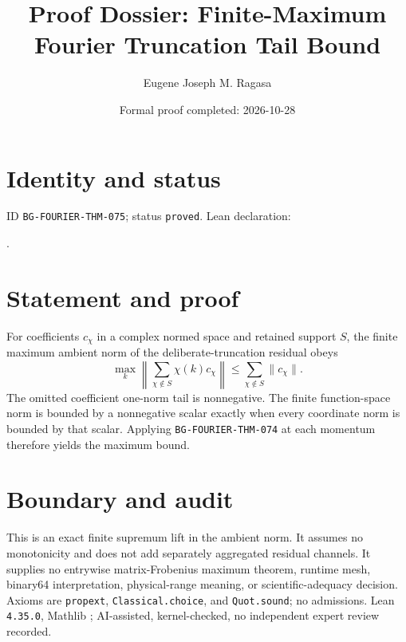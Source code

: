 \documentclass[11pt]{article}
\title{Proof Dossier: Finite-Maximum Fourier Truncation Tail Bound}\author{Eugene Joseph M. Ragasa}\date{Formal proof completed: 2026-10-28}
\begin{document}
\raggedright\maketitle
\section{Identity and status}
ID \texttt{BG-FOURIER-THM-075}; status \texttt{proved}. Lean declaration:
\par{}.
\section{Statement and proof}
For coefficients $c_\chi$ in a complex normed space and retained support $S$, the finite maximum ambient norm of the deliberate-truncation residual obeys
\[
 \max_k\left\|\sum_{\chi\notin S}\chi(k)c_\chi\right\|
 \leq \sum_{\chi\notin S}\|c_\chi\|.
\]
The omitted coefficient one-norm tail is nonnegative. The finite function-space norm is bounded by a nonnegative scalar exactly when every coordinate norm is bounded by that scalar. Applying \texttt{BG-FOURIER-THM-074} at each momentum therefore yields the maximum bound.
\section{Boundary and audit}
This is an exact finite supremum lift in the ambient norm. It assumes no monotonicity and does not add separately aggregated residual channels. It supplies no entrywise matrix-Frobenius maximum theorem, runtime mesh, binary64 interpretation, physical-range meaning, or scientific-adequacy decision. Axioms are \texttt{propext}, \texttt{Classical.choice}, and \texttt{Quot.sound}; no admissions. Lean \texttt{4.35.0}, Mathlib {\scriptsize{}}; AI-assisted, kernel-checked, no independent expert review recorded.
\end{document}
